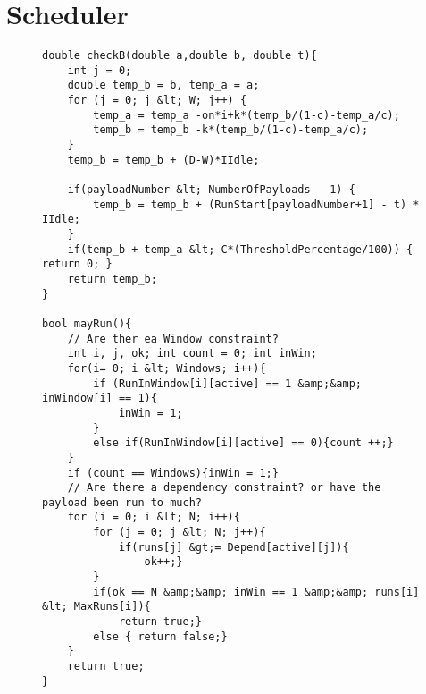 \section{Scheduler}
\begin{figure}[H]
	\begin{lstlisting}[language=my_c, caption={Declarations for Scheduler template}, label=lst:scheduler_code]
double checkB(double a,double b, double t){
	int j = 0;
	double temp_b = b, temp_a = a;
	for (j = 0; j &lt; W; j++) {
		temp_a = temp_a -on*i+k*(temp_b/(1-c)-temp_a/c);
		temp_b = temp_b -k*(temp_b/(1-c)-temp_a/c);
	}
	temp_b = temp_b + (D-W)*IIdle;

	if(payloadNumber &lt; NumberOfPayloads - 1) {
		temp_b = temp_b + (RunStart[payloadNumber+1] - t) * IIdle;
	}
	if(temp_b + temp_a &lt; C*(ThresholdPercentage/100)) { return 0; }
	return temp_b;
}

bool mayRun(){
	// Are ther ea Window constraint?
	int i, j, ok; int count = 0; int inWin;
	for(i= 0; i &lt; Windows; i++){
		if (RunInWindow[i][active] == 1 &amp;&amp; inWindow[i] == 1){
			inWin = 1;
		}
		else if(RunInWindow[i][active] == 0){count ++;}
	}
	if (count == Windows){inWin = 1;}
	// Are there a dependency constraint? or have the payload been run to much?
	for (i = 0; i &lt; N; i++){
		for (j = 0; j &lt; N; j++){
			if(runs[j] &gt;= Depend[active][j]){
				ok++;}
		}
		if(ok == N &amp;&amp; inWin == 1 &amp;&amp; runs[i] &lt; MaxRuns[i]){
			return true;}
		else { return false;}
	}
	return true;
}
	\end{lstlisting}
\end{figure}


